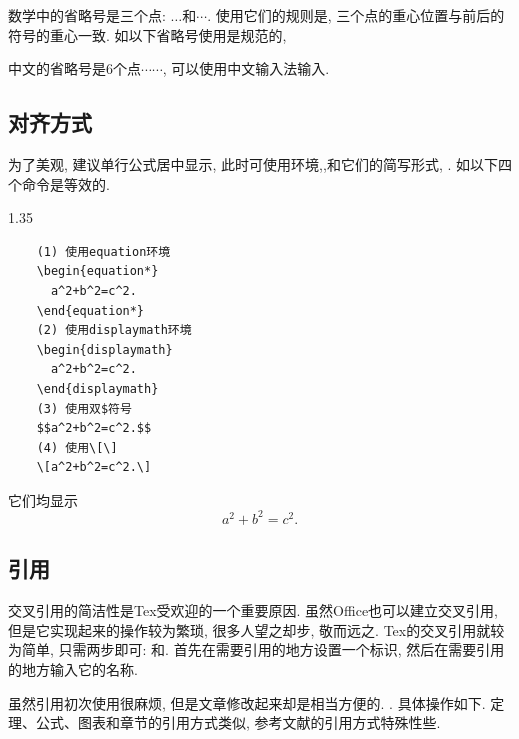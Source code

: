 \documentclass[a4paper,12pt,twoside]{ctexart}
\begin{document}
    数学中的省略号是三个点: $\ldots$和$\cdots$. 使用它们的规则是, 三个点的重心位置与前后的符号的重心一致. 如以下省略号使用是规范的,
    \medskip

    \noindent

    中文的省略号是6个点$\cdots\cdots$, 可以使用中文输入法输入.


\subsection{对齐方式}
    为了美观, 建议单行公式居中显示, 此时可使用环境,,和它们的简写形式, . 如以下四个命令是等效的. \\[-20pt]
    \begin{spacing}{1.35}
    \begin{verbatim}
    (1) 使用equation环境
    \begin{equation*}
      a^2+b^2=c^2.
    \end{equation*}
    (2) 使用displaymath环境
    \begin{displaymath}
      a^2+b^2=c^2.
    \end{displaymath}
    (3) 使用双$符号
    $$a^2+b^2=c^2.$$
    (4) 使用\[\]
    \[a^2+b^2=c^2.\]
    \end{verbatim}
    \end{spacing}\vspace*{-18pt}\noindent
    它们均显示
    \begin{displaymath}
      a^2+b^2=c^2.
    \end{displaymath}

\subsection{引用}
    交叉引用的简洁性是Tex受欢迎的一个重要原因. 虽然Office也可以建立交叉引用, 但是它实现起来的操作较为繁琐, 很多人望之却步, 敬而远之. Tex的交叉引用就较为简单, 只需两步即可: 和. 首先在需要引用的地方设置一个标识, 然后在需要引用的地方输入它的名称.

    虽然引用初次使用很麻烦, 但是文章修改起来却是相当方便的. . 具体操作如下. 定理、公式、图表和章节的引用方式类似, 参考文献的引用方式特殊性些.
\end{document}
